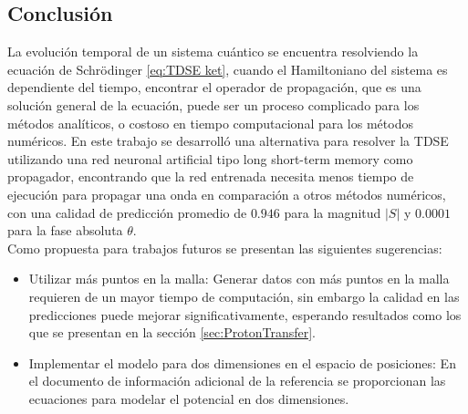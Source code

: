 \subsection{Conclusión}
La evolución temporal de un sistema cuántico se encuentra resolviendo la ecuación de Schrödinger \autoref{eq:TDSE ket}, cuando el Hamiltoniano del sistema es dependiente del tiempo, encontrar el operador de propagación, que es una solución general de la ecuación, puede ser un proceso complicado para los métodos analíticos, o costoso en tiempo computacional para los métodos numéricos. En este trabajo se desarrolló una alternativa para resolver la \acs{TDSE} utilizando una red neuronal artificial tipo long short-term memory como propagador, encontrando que la red entrenada necesita menos tiempo de ejecución para propagar una onda en comparación a otros métodos numéricos, con una calidad de predicción promedio de $0.946$ para la magnitud $|S|$ y $0.0001$ para la fase absoluta $\theta$. \\
Como propuesta para trabajos futuros se presentan las siguientes sugerencias:
\begin{itemize}[label=\textcolor{CTtitle}{\textbullet}]
\item Utilizar más puntos en la malla: Generar datos con más puntos en la malla requieren de un mayor tiempo de computación, sin embargo la calidad en las predicciones puede mejorar significativamente, esperando resultados como los que se presentan en la sección \autoref{sec:ProtonTransfer}.
\item Implementar el modelo para dos dimensiones en el espacio de posiciones: En el documento de información adicional de la referencia \cite{Main:2021} se proporcionan las ecuaciones para modelar el potencial en dos dimensiones.
\end{itemize}